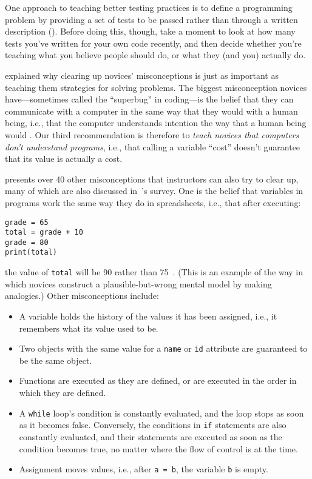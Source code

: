 One approach to teaching better testing practices is to define a programming problem by providing a set of tests to be passed rather than through a written description (). Before doing this, though, take a moment to look at how many tests you've written for your own code recently, and then decide whether you're teaching what you believe people should do, or what they (and you) actually do.


 explained why clearing up novices' misconceptions is just as important as teaching them strategies for solving problems. The biggest misconception novices have---sometimes called the ``superbug'' in coding---is the belief that they can communicate with a computer in the same way that they would with a human being, i.e., that the computer understands intention the way that a human being would \cite{Pea1986}. Our third recommendation is therefore to \emph{teach novices that computers don't understand programs}, i.e., that calling a variable ``cost'' doesn't guarantee that its value is actually a cost.

\cite{Sorv2018} presents over 40 other misconceptions that instructors can also try to clear up, many of which are also discussed in~\cite{Qian2017}'s survey. One is the belief that variables in programs work the same way they do in spreadsheets, i.e., that after executing:

\begin{verbatim}
grade = 65
total = grade + 10
grade = 80
print(total)
\end{verbatim}

\noindent
the value of \texttt{total} will be 90 rather than 75~\cite{Kohn2017}. (This is an example of the way in which novices construct a plausible-but-wrong mental model by making analogies.) Other misconceptions include:

\begin{itemize}

\item
  A variable holds the history of the values it has been assigned, i.e., it remembers what its value used to be.

\item
  Two objects with the same value for a \texttt{name} or \texttt{id} attribute are guaranteed to be the same object.

\item
  Functions are executed as they are defined, or are executed in the order in which they are defined.

\item
  A \texttt{while} loop's condition is constantly evaluated, and the loop stops as soon as it becomes false. Conversely, the conditions in \texttt{if} statements are also constantly evaluated, and their statements are executed as soon as the condition becomes true, no matter where the flow of control is at the time.

\item
  Assignment moves values, i.e., after \texttt{a\ =\ b}, the variable \texttt{b} is empty.

\end{itemize}

